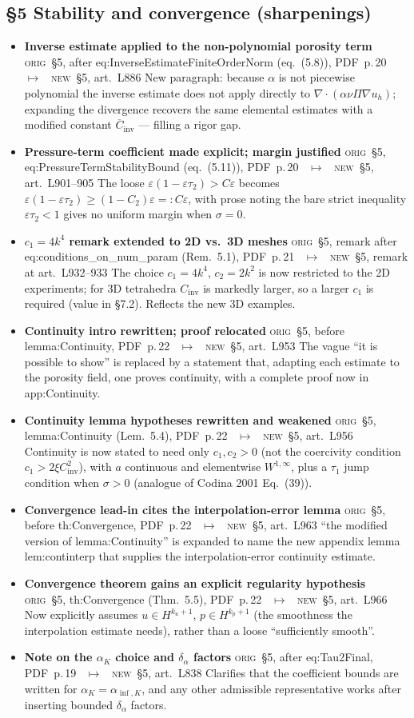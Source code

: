 \documentclass[11pt]{article}
\newcommand{\Orig}{\textcolor{origc}{\footnotesize\textsc{orig}}}
\newcommand{\New}{\textcolor{newc}{\footnotesize\textsc{new}}}
\newcommand{\code}[1]{\textcolor{newc}{\ttfamily\small #1}}
\newcommand{\pdfp}[1]{PDF~p.\,#1}
\newcommand{\artl}[1]{art.\ L#1}       %
\newcommand{\ch}[4]{%
  \item \textbf{#1}\newline
    {\footnotesize\Orig\ #2 \ \textcolor{locc}{$\longmapsto$} \ \New\ #3}\newline
    #4}
\begin{document}
\subsection{\S5 Stability and convergence (sharpenings)}
\begin{itemize}
\ch{Inverse estimate applied to the non-polynomial porosity term}
   {\S5, after \code{eq:InverseEstimateFiniteOrderNorm} (eq.~(5.8)), \pdfp{20}}
   {\S5, \artl{886}}
   {New paragraph: because $\alpha$ is not piecewise polynomial the inverse estimate does not apply
    directly to $\nabla\!\cdot\!(\alpha\nu\Pi\nabla u_h)$; expanding the divergence recovers the same
    elemental estimates with a modified constant $\overline C_{\mathrm{inv}}$ --- filling a rigor gap.}
\ch{Pressure-term coefficient made explicit; margin justified}
   {\S5, \code{eq:PressureTermStabilityBound} (eq.~(5.11)), \pdfp{20}}
   {\S5, \artl{901}--905}
   {The loose $\varepsilon(1-\varepsilon\tau_2)>C\varepsilon$ becomes
    $\varepsilon(1-\varepsilon\tau_2)\ge(1-C_2)\varepsilon=:C\varepsilon$, with prose noting the bare
    strict inequality $\varepsilon\tau_2<1$ gives no uniform margin when $\sigma=0$.}
\ch{$c_1{=}4k^4$ remark extended to 2D vs.\ 3D meshes}
   {\S5, remark after \code{eq:conditions_on_num_param} (Rem.~5.1), \pdfp{21}}
   {\S5, remark at \artl{932}--933}
   {The choice $c_1{=}4k^4$, $c_2{=}2k^2$ is now restricted to the 2D experiments; for 3D tetrahedra
    $C_{\mathrm{inv}}$ is markedly larger, so a larger $c_1$ is required (value in \S7.2). Reflects the
    new 3D examples.}
\ch{Continuity intro rewritten; proof relocated}
   {\S5, before \code{lemma:Continuity}, \pdfp{22}}
   {\S5, \artl{953}}
   {The vague ``it is possible to show'' is replaced by a statement that, adapting each estimate to
    the porosity field, one proves continuity, with a complete proof now in \code{app:Continuity}.}
\ch{Continuity lemma hypotheses rewritten and weakened}
   {\S5, \code{lemma:Continuity} (Lem.~5.4), \pdfp{22}}
   {\S5, \artl{956}}
   {Continuity is now stated to need only $c_1,c_2>0$ (not the coercivity condition
    $c_1>2\xi C_{\mathrm{inv}}^2$), with $a$ continuous and elementwise $W^{1,\infty}$, plus a
    $\tau_1$ jump condition when $\sigma>0$ (analogue of Codina 2001 Eq.~(39)).}
\ch{Convergence lead-in cites the interpolation-error lemma}
   {\S5, before \code{th:Convergence}, \pdfp{22}}
   {\S5, \artl{963}}
   {``the modified version of \code{lemma:Continuity}'' is expanded to name the new appendix lemma
    \code{lem:continterp} that supplies the interpolation-error continuity estimate.}
\ch{Convergence theorem gains an explicit regularity hypothesis}
   {\S5, \code{th:Convergence} (Thm.~5.5), \pdfp{22}}
   {\S5, \artl{966}}
   {Now explicitly assumes $u\in H^{k_u+1}$, $p\in H^{k_p+1}$ (the smoothness the interpolation
    estimate needs), rather than a loose ``sufficiently smooth''.}
\ch{Note on the $\alpha_K$ choice and $\delta_\alpha$ factors}
   {\S5, after \code{eq:Tau2Final}, \pdfp{19}}
   {\S5, \artl{838}}
   {Clarifies that the coefficient bounds are written for $\alpha_K=\alpha_{\inf,K}$, and any other
    admissible representative works after inserting bounded $\delta_\alpha$ factors.}
\end{itemize}
\end{document}
